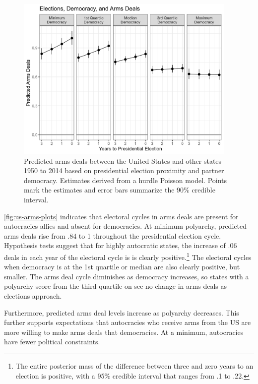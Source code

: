 \documentclass[12pt]{article}
\begin{document}
\begin{figure}[htpb]
	\centering
		\includegraphics[width=0.95\textwidth]{../figures/democ-deals-pred.png}
	\caption{Predicted arms deals between the United States and other states 1950 to 2014 based on presidential election proximity and partner democracy. Estimates derived from a hurdle Poisson model. Points mark the estimates and error bars summarize the 90\% credible interval.}
	\label{fig:democ-deals-pred}
\end{figure}


\autoref{fig:us-arms-plots} indicates that electoral cycles in arms deals are present for autocracies allies and absent for democracies.
At minimum polyarchy, predicted arms deals rise from .84 to 1 throughout the presidential election cycle.
Hypothesis tests suggest that for highly autocratic states, the increase of .06 deals in each year of the electoral cycle is is clearly positive.\footnote{The entire posterior mass of the difference between three and zero years to an election is positive, with a 95\% credible interval that ranges from .1 to .22.}
The electoral cycles when democracy is at the 1st quartile or median are also clearly positive, but smaller.
The arms deal cycle diminishes as democracy increases, so states with a polyarchy score from the third quartile on see no change in arms deals as elections approach.  


Furthermore, predicted arms deal levels increase as polyarchy decreases. 
This further supports expectations that autocracies who receive arms from the US are more willing to make arms deals that democracies. 
At a minimum, autocracies have fewer political constraints. 
\end{document}
